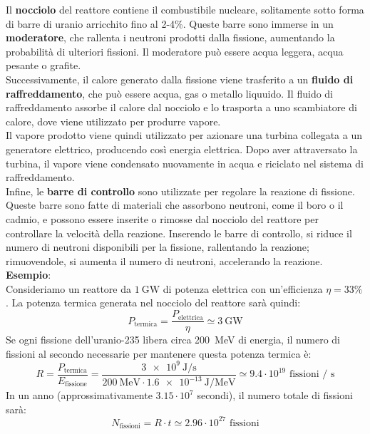 Il \textbf{nocciolo} del reattore contiene il combustibile nucleare, solitamente sotto forma di barre di uranio arricchito fino al 2-4\%. Queste barre sono immerse in un \textbf{moderatore}, che rallenta i neutroni prodotti dalla fissione, aumentando la probabilità di ulteriori fissioni. Il moderatore può essere acqua leggera, acqua pesante o grafite.\\
Successivamente, il calore generato dalla fissione viene trasferito a un \textbf{fluido di raffreddamento}, che può essere acqua, gas o metallo liquuido. Il fluido di raffreddamento assorbe il calore dal nocciolo e lo trasporta a uno scambiatore di calore, dove viene utilizzato per produrre vapore.\\
Il vapore prodotto viene quindi utilizzato per azionare una turbina collegata a un generatore elettrico, producendo così energia elettrica. Dopo aver attraversato la turbina, il vapore viene condensato nuovamente in acqua e riciclato nel sistema di raffreddamento.\\
Infine, le \textbf{barre di controllo} sono utilizzate per regolare la reazione di fissione. Queste barre sono fatte di materiali che assorbono neutroni, come il boro o il cadmio, e possono essere inserite o rimosse dal nocciolo del reattore per controllare la velocità della reazione. Inserendo le barre di controllo, si riduce il numero di neutroni disponibili per la fissione, rallentando la reazione; rimuovendole, si aumenta il numero di neutroni, accelerando la reazione.\\
\textbf{Esempio}:\\
Consideriamo un reattore da $\qty{1}{\giga\watt}$ di potenza elettrica con un'efficienza $\eta = 33\%$. La potenza termica generata nel nocciolo del reattore sarà quindi:
\begin{equation}
    P_{\text{termica}} = \dfrac{P_{\text{elettrica}}}{\eta} \simeq \qty{3}{\giga\watt}
\end{equation}
Se ogni fissione dell'uranio-235 libera circa \qty{200}{\mega\electronvolt} di energia, il numero di fissioni al secondo necessarie per mantenere questa potenza termica è:
\begin{equation}
    R = \dfrac{P_{\text{termica}}}{E_{\text{fissione}}} = \dfrac{\qty{3e9}{\joule\per\second}}{\qty{200}{\mega\electronvolt} \cdot \qty{1.6e-13}{\joule\per\mega\electronvolt}} \simeq 9.4 \cdot 10^{19} \text{ fissioni / s}
\end{equation}
In un anno (approssimativamente $3.15 \cdot 10^7$ secondi), il numero totale di fissioni sarà:
\begin{equation}
    N_{\text{fissioni}} = R \cdot t \simeq 2.96 \cdot 10^{27} \text{ fissioni}
\end{equation}

